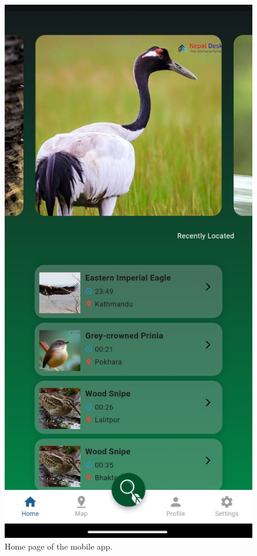 \begin{figure}[h!]
      \centering
      \includegraphics[scale=0.38]{images/Homepage.jpg}
      \caption{Home page of the mobile app.}
  \end{figure}

